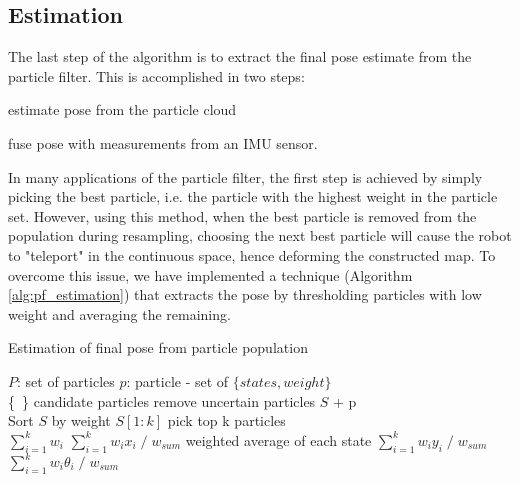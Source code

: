 \subsection{Estimation}

The last step of the algorithm is to extract the final pose estimate from
the particle filter. This is accomplished in two steps:
\begin{enumerate*}[label=(\roman*)]
    \item estimate pose from the particle cloud
    \item fuse pose with measurements from an IMU sensor.
\end{enumerate*}

In many applications of the particle filter, the first step is achieved
by simply picking the best particle, i.e. the particle with the highest
weight in the particle set.
However, using this method, when the best particle is removed from the
population during resampling, choosing the next best particle will cause the
robot to "teleport" in the continuous space, hence deforming the constructed
map.
To overcome this issue, we have implemented a technique
(Algorithm \ref{alg:pf_estimation}) that extracts the pose by thresholding
particles with low weight and averaging the remaining.

\begin{algorithm}
    \caption{Estimation of final pose from particle population}
    \label{alg:pf_estimation}
    \begin{algorithmic}[1]
        \State $P$: set of particles
        \State $p$: particle - set of $\{states, weight\}$ \\

         {\{\ \}}
        \Comment candidate particles
                \Comment remove uncertain particles
                 {$S$ + p}
            \EndIf
        \EndFor \\

        \State Sort $S$ by weight
         {$S[1:k]$}
        \Comment pick top k particles \\

         {$\sum^k_{i=1} w_i$}
         {$\sum^k_{i=1} w_i x_i \; / \; w_{sum}$}
        \Comment weighted average of each state
         {$\sum^k_{i=1} w_i y_i \; / \; w_{sum}$}
        \Let {$\theta$} {$\sum^k_{i=1} w_i \theta_i \; / \; w_{sum}$}
    \end{algorithmic}
\end{algorithm}

